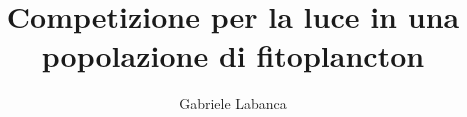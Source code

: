 \documentclass{beamer}
\title{Competizione per la luce in una popolazione di fitoplancton}
\author{Gabriele Labanca}
\begin{document}
\frame{\titlepage}









\end{document}
